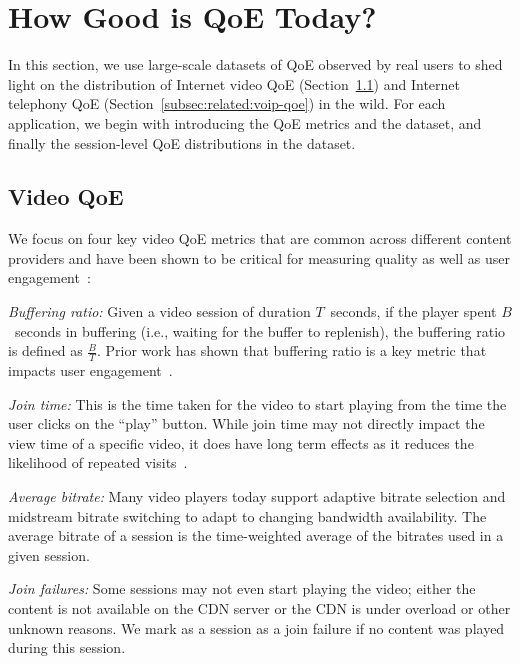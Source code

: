 \section{How Good is QoE Today?}
\label{sec:related:qoe}

In this section, we use large-scale datasets of QoE observed by
real users to shed light on the distribution of Internet video QoE
(Section~\ref{subsec:related:video-qoe}) and Internet telephony QoE
(Section~\ref{subsec:related:voip-qoe}) in the wild. 
For each application, we begin with introducing the QoE metrics and 
the dataset, and finally the session-level 
QoE distributions in the dataset.

\subsection{Video QoE}
\label{subsec:related:video-qoe}

We focus on  four key video QoE metrics that are common across 
different  content providers and have been shown to be
 critical for measuring quality as well as user
  engagement~\cite{sigcomm11}: 
\begin{packedenumerate}

\item \emph{Buffering ratio:}  Given a video session of 
duration $T$~seconds,  if the player spent $B$~seconds in 
buffering (i.e., waiting for the 
 buffer to replenish), the buffering ratio is defined as 
 $\frac{B}{T}$. 
 Prior work has shown that buffering ratio is a key metric
 that impacts user engagement~\cite{sigcomm11}.

\item \emph{Join time:}  This is the time taken for the video 
to start playing  from the time the user clicks on the ``play'' 
button. 
While join time may not directly impact the view time of a 
specific video,
it does have long term effects as it reduces the likelihood 
of repeated visits~\cite{sigcomm11,imc12akamai}.  
 

\item \emph{Average bitrate:} 
Many video players today support adaptive bitrate
selection and midstream bitrate switching to adapt to 
changing bandwidth availability. 
The average bitrate of a session is the time-weighted
average of the bitrates used in a given session. 


\item \emph{Join failures:}   Some sessions may not even 
start playing the video; either the content is not available
 on the CDN server or the CDN is under overload or other 
unknown reasons. We mark as a session as a join failure
if no content was played during this session.

\end{packedenumerate}


